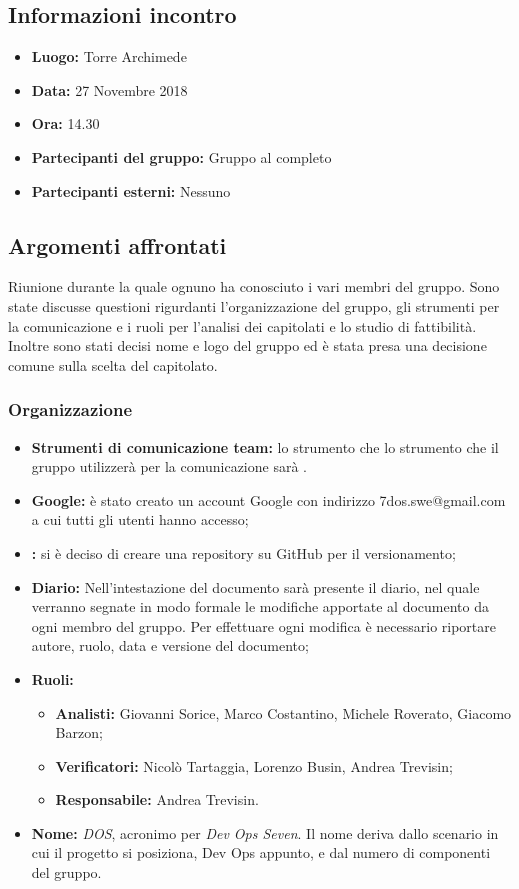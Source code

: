 \subsection{Informazioni incontro}
\begin{itemize}
	\item { \textbf{Luogo:} Torre Archimede  }
	\item { \textbf{Data:} 27 Novembre 2018 }
	\item { \textbf{Ora:} 14.30 }
	\item { \textbf{Partecipanti del gruppo:} Gruppo al completo }
	\item { \textbf{Partecipanti esterni:} Nessuno }
\end{itemize}


\subsection{Argomenti affrontati}
Riunione durante la quale ognuno ha conosciuto i vari membri del gruppo. Sono state discusse questioni rigurdanti l'organizzazione del gruppo, gli strumenti per la comunicazione e i ruoli per l'analisi dei capitolati e lo studio di fattibilità. Inoltre sono stati decisi nome e logo del gruppo ed è stata presa una decisione comune sulla scelta del capitolato.

\subsubsection{Organizzazione}
\begin{itemize}
	\item { \textbf{Strumenti di comunicazione team:} lo strumento che lo strumento che il gruppo utilizzerà per la comunicazione sarà \textit{}.}
	\item{ \textbf{Google:} è stato creato un account Google con indirizzo 7dos.swe@gmail.com a cui tutti gli utenti hanno accesso;}
	\item { \textbf{:} si è deciso di creare una repository su GitHub per il versionamento;}
	\item { \textbf{Diario:} Nell'intestazione del documento sarà presente il diario, nel quale verranno segnate in modo formale le modifiche apportate al documento da ogni membro del gruppo.
		Per effettuare ogni modifica è necessario riportare autore, ruolo, data e versione del documento;}
	\item { \textbf{Ruoli:}  }
	\begin{itemize}
		\item { \textbf{Analisti:} Giovanni Sorice, Marco Costantino, Michele Roverato, Giacomo Barzon;}
		\item { \textbf{Verificatori:} Nicolò Tartaggia, Lorenzo Busin, Andrea Trevisin;}
		\item { \textbf{Responsabile:} Andrea Trevisin.}
	\end{itemize}
	\item { \textbf{Nome:} \emph{DOS}, acronimo per \emph{Dev Ops Seven}. Il nome deriva dallo scenario in cui il progetto si posiziona, Dev Ops appunto, e dal numero di componenti del gruppo.}
\end{itemize}

